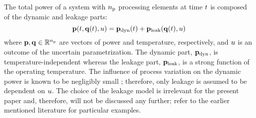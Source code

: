 The total power of a system with ${n_\text{p}}$ processing elements at time $t$ is composed of the dynamic and leakage parts:
\begin{equation} \elabel{total-power}
  \vP(\t, \vT(\t), \u) = \vP_\dyn(\t) + \vP_\leak(\vT(\t), \u)
\end{equation}
where $\mathbf{p}, \mathbf{q} \in \mathbb{R}^{n_\text{p}}$ are vectors of power and temperature, respectively, and $u$ is an outcome of the uncertain parametrization. The dynamic part, $\mathbf{p}_{\text{dyn}}$, is temperature-independent whereas the leakage part, $\mathbf{p}_{\text{leak}}$, is a strong function of the operating temperature. The influence of process variation on the dynamic power is known to be negligibly small \cite{srivastava2010, juan2011, juan2012}; therefore, only leakage is assumed to be dependent on $u$. The choice of the leakage model is irrelevant for the present paper and, therefore, will not be discussed any further; refer to the earlier mentioned literature for particular examples.
